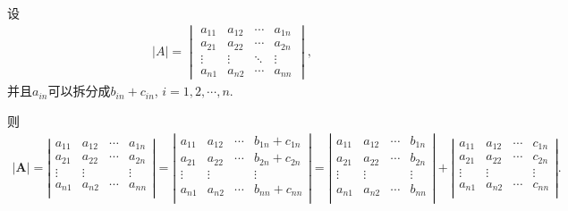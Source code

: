 \documentclass[../../main.tex]{subfiles}
\begin{document}
\begin{proposition}\label{小拆分法}
设
\begin{align*}
|A| = 
\begin{vmatrix}
a_{11} & a_{12} & \cdots & a_{1n} \\
a_{21} & a_{22} & \cdots & a_{2n} \\
\vdots & \vdots & \ddots & \vdots \\
a_{n1} & a_{n2} & \cdots & a_{nn}
\end{vmatrix},
\nonumber
\end{align*}
并且$a_{in}$可以拆分成$b_{in}+c_{in}$,$\,\,i=1,2,\cdots,n.$

则
\begin{align*}
\left| \boldsymbol{A} \right|=\left| \begin{matrix}
a_{11}&		a_{12}&		\cdots&		a_{1n}\\
a_{21}&		a_{22}&		\cdots&		a_{2n}\\
\vdots&		\vdots&		&		\vdots\\
a_{n1}&		a_{n2}&		\cdots&		a_{nn}\\
\end{matrix} \right|=\left| \begin{matrix}
a_{11}&		a_{12}&		\cdots&		b_{1n}+c_{1n}\\
a_{21}&		a_{22}&		\cdots&		b_{2n}+c_{2n}\\
\vdots&		\vdots&		&		\vdots\\
a_{n1}&		a_{n2}&		\cdots&		b_{nn}+c_{nn}\\
\end{matrix} \right|=\left| \begin{matrix}
a_{11}&		a_{12}&		\cdots&		b_{1n}\\
a_{21}&		a_{22}&		\cdots&		b_{2n}\\
\vdots&		\vdots&		&		\vdots\\
a_{n1}&		a_{n2}&		\cdots&		b_{nn}\\
\end{matrix} \right|+\left| \begin{matrix}
a_{11}&		a_{12}&		\cdots&		c_{1n}\\
a_{21}&		a_{22}&		\cdots&		c_{2n}\\
\vdots&		\vdots&		&		\vdots\\
a_{n1}&		a_{n2}&		\cdots&		c_{nn}\\
\end{matrix} \right|.
\end{align*}
\end{proposition}
\end{document}
